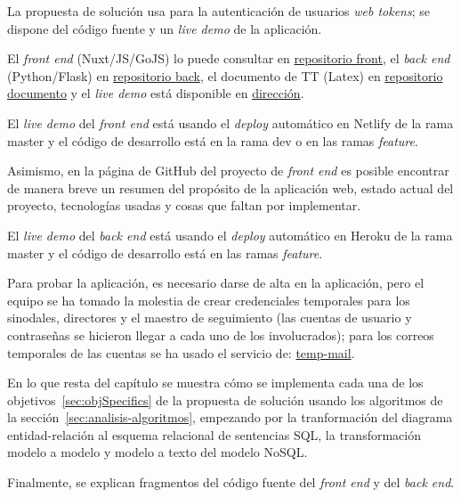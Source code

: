 La propuesta de solución usa para la autenticación de usuarios \textit{web tokens}; se dispone del código fuente y un \textit{live demo} de la aplicación.


El \textit{front end} (Nuxt/JS/GoJS) lo puede consultar en \href{https://github.com/martinez-acosta/TT-2019-B052}{repositorio front}, el \textit{back end} (Python/Flask) en \href{https://github.com/omaraparicio07/api-tt-2019-b052}{repositorio back}, el documento de TT (Latex) en \href{https://github.com/martinez-acosta/DOCS-TT-2019-B052}{repositorio documento} y el \textit{live demo} está disponible en \href{https://serene-haibt-2239b4.netlify.app/}{dirección}.


El \textit{live demo} del \textit{front end} está usando el \textit{deploy} automático en Netlify de la rama master y el código de desarrollo está en la rama dev o en las ramas \textit{feature}.


Asimismo, en la página de GitHub del proyecto de \textit{front end} es posible encontrar de manera breve un resumen del propósito de la aplicación web, estado actual del proyecto, tecnologías usadas y cosas que faltan por implementar.


El \textit{live demo} del \textit{back end} está usando el \textit{deploy} automático en Heroku de la rama master y el código de desarrollo está en las ramas \textit{feature}.


Para probar la aplicación, es necesario darse de alta en la aplicación, pero el equipo se ha tomado la molestia de crear credenciales temporales para los sinodales, directores y el maestro de seguimiento (las cuentas de usuario y contraseñas se hicieron llegar a cada uno de los involucrados); para los correos temporales de las cuentas se ha usado el servicio de: \href{https://temp-mail.org/es/}{temp-mail}.


En lo que resta del capítulo se muestra cómo se implementa cada una de los objetivos~\ref{sec:objSpecifics} de la propuesta de solución usando los algoritmos de la sección~\ref{sec:analisis-algoritmos}, empezando por la tranformación del diagrama entidad-relación al esquema relacional de sentencias SQL, la transformación modelo a modelo y modelo a texto del modelo NoSQL.

Finalmente, se explican fragmentos del código fuente del \textit{front end} y del \textit{back end}. 









